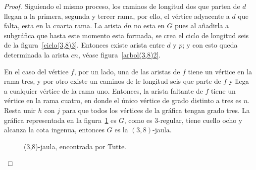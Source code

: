 \documentclass[12pt]{book}
\theoremstyle{definition}
\begin{document}
\begin{proof}
Siguiendo el mismo proceso, los caminos de longitud dos que parten de $d$ llegan
a la primera, segunda y tercer rama, por ello, el vértice adyacente a
$d$ que falta, esta en la cuarta rama. La arista $dn$ no esta en $G$
pues al añadirla a subgráfica que hasta este momento esta formada, se crea el
ciclo de longitud seis de la figura~\ref{ciclo(3,8)3}. Entonces existe arista
entre $d$ y $p$; y con esto queda determinada la arista $cn$, véase figura~\ref{arbol(3,8)2}.


En el caso del vértice $f$, por un lado, una de las aristas de $f$
tiene un vértice en la rama tres, y por otro existe un caminos de le
longitud seis que parte de $f$ y llega a cualquier vértice de la rama uno. Entonces, la arista faltante de
$f$ tiene un vértice en la rama cuatro, en donde el único vértice de
grado distinto a tres es $n$. Resta unir $h$ con
$j$ para que todos los vértices de la gráfica tengan grado tres. La
gráfica representada en la figura~\ref{jaula(3,8)} es $G$, como es
3-regular, tiene cuello ocho y alcanza la cota ingenua, entonces $G$
es la $(3,8)$-jaula. 



\begin{figure}
  \centering
  \caption{(3,8)-jaula, encontrada por Tutte.} \label{jaula(3,8)}
\end{figure}

\end{proof}
\end{document}
